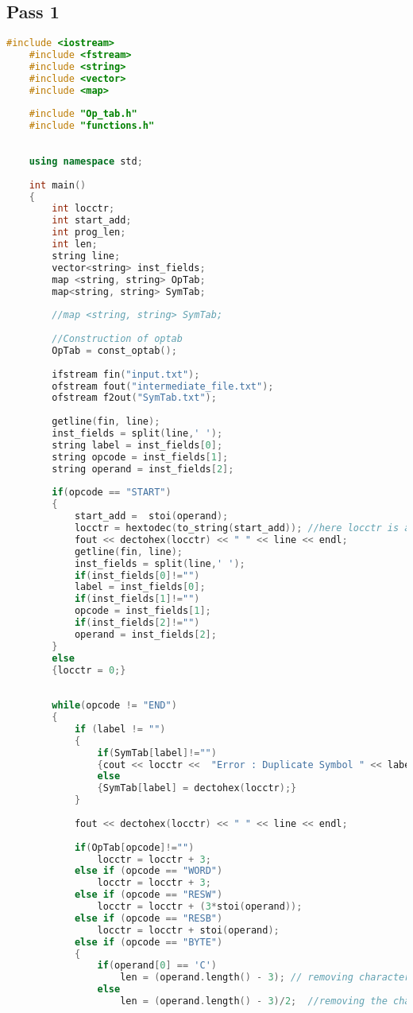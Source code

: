 \documentclass[12pt]{article}
\begin{document}
\subsection{Pass 1}
\begin{lstlisting}[language=C++, caption={Pass 1 - Intermediate File Generator}]
    #include <iostream>
    #include <fstream>
    #include <string>
    #include <vector>
    #include <map>
    
    #include "Op_tab.h"
    #include "functions.h"
    
    
    using namespace std;
    
    int main()
    {
        int locctr;
        int start_add;
        int prog_len;
        int len;
        string line;
        vector<string> inst_fields;
        map <string, string> OpTab;
        map<string, string> SymTab;
    
        //map <string, string> SymTab;
    
        //Construction of optab
        OpTab = const_optab();
    
        ifstream fin("input.txt");
        ofstream fout("intermediate_file.txt");
        ofstream f2out("SymTab.txt");
    
        getline(fin, line);
        inst_fields = split(line,' ');
        string label = inst_fields[0];
        string opcode = inst_fields[1];
        string operand = inst_fields[2];
        
        if(opcode == "START")
        {
            start_add =  stoi(operand);
            locctr = hextodec(to_string(start_add)); //here locctr is already in hex
            fout << dectohex(locctr) << " " << line << endl;
            getline(fin, line);
            inst_fields = split(line,' ');
            if(inst_fields[0]!="")
            label = inst_fields[0];
            if(inst_fields[1]!="")
            opcode = inst_fields[1];
            if(inst_fields[2]!="")
            operand = inst_fields[2];
        }
        else
        {locctr = 0;}
        
    
        while(opcode != "END")
        {
            if (label != "")
            {
                if(SymTab[label]!="")
                {cout << locctr <<  "Error : Duplicate Symbol " << label << endl;}
                else
                {SymTab[label] = dectohex(locctr);}
            }
    
            fout << dectohex(locctr) << " " << line << endl;
            
            if(OpTab[opcode]!="")
                locctr = locctr + 3;
            else if (opcode == "WORD")
                locctr = locctr + 3;
            else if (opcode == "RESW")
                locctr = locctr + (3*stoi(operand));
            else if (opcode == "RESB")
                locctr = locctr + stoi(operand);
            else if (opcode == "BYTE")
            {
                if(operand[0] == 'C')
                    len = (operand.length() - 3); // removing character {c,' , '}
                else 
                    len = (operand.length() - 3)/2;  //removing the characters {X ' '}
    

\end{lstlisting}
\end{document}
